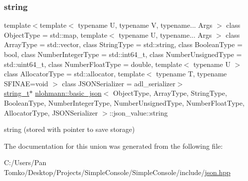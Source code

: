 \subsubsection{\texorpdfstring{string}{string}}
{\footnotesize\ttfamily template$<$template$<$ typename U, typename V, typename... Args $>$ class Object\+Type = std\+::map, template$<$ typename U, typename... Args $>$ class Array\+Type = std\+::vector, class String\+Type  = std\+::string, class Boolean\+Type  = bool, class Number\+Integer\+Type  = std\+::int64\+\_\+t, class Number\+Unsigned\+Type  = std\+::uint64\+\_\+t, class Number\+Float\+Type  = double, template$<$ typename U $>$ class Allocator\+Type = std\+::allocator, template$<$ typename T, typename S\+F\+I\+N\+A\+E=void $>$ class J\+S\+O\+N\+Serializer = adl\+\_\+serializer$>$ \\
\mbox{\hyperlink{classnlohmann_1_1basic__json_a61f8566a1a85a424c7266fb531dca005}{string\+\_\+t}}$\ast$ \mbox{\hyperlink{classnlohmann_1_1basic__json}{nlohmann\+::basic\+\_\+json}}$<$ Object\+Type, Array\+Type, String\+Type, Boolean\+Type, Number\+Integer\+Type, Number\+Unsigned\+Type, Number\+Float\+Type, Allocator\+Type, J\+S\+O\+N\+Serializer $>$\+::json\+\_\+value\+::string}



string (stored with pointer to save storage) 



The documentation for this union was generated from the following file\+:\begin{DoxyCompactItemize}
\item 
C\+:/\+Users/\+Pan Tomko/\+Desktop/\+Projects/\+Simple\+Console/\+Simple\+Console/include/\mbox{\hyperlink{json_8hpp}{json.\+hpp}}\end{DoxyCompactItemize}
